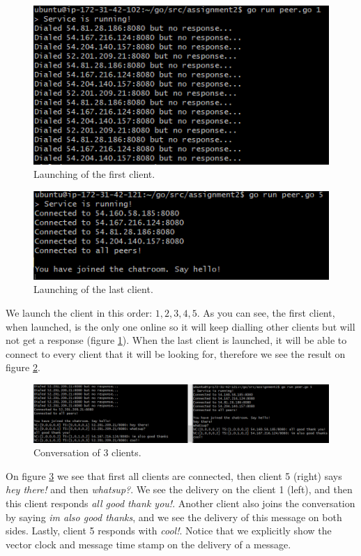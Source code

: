 \documentclass[11pt,reqno]{amsart}
\begin{document}
\begin{figure}[h]
\centering
\includegraphics[width=0.75\linewidth]{launch1.png}
\caption{Launching of the first client.}
\label{fig:1}
\end{figure}

\begin{figure}[h]
\centering
\includegraphics[width=0.75\linewidth]{launch5.png}
\caption{Launching of the last client.}
\label{fig:2}
\end{figure}

We launch the client in this order: $1, 2, 3, 4, 5$. As you can see, the first client, when launched, is the only one online so it will keep dialling other clients but will not get a response (figure \ref{fig:1}). When the last client is launched, it will be able to connect to every client that it will be looking for, therefore we see the result on figure \ref{fig:2}. 

\begin{figure}[h]
\centering
\includegraphics[width=\linewidth]{speaking.png}
\caption{Conversation of 3 clients.}
\label{fig:3}
\end{figure}

On figure \ref{fig:3} we see that first all clients are connected, then client 5 (right) says \textit{hey there!} and then \textit{whatsup?}. We see the delivery on the client 1 (left), and then this client responds \textit{all good thank you!}. Another client also joins the conversation by saying \textit{im also good thanks}, and we see the delivery of this message on both sides. Lastly, client 5 responds with \textit{cool!}. Notice that we explicitly show the vector clock and message time stamp on the delivery of a message.
\end{document}
